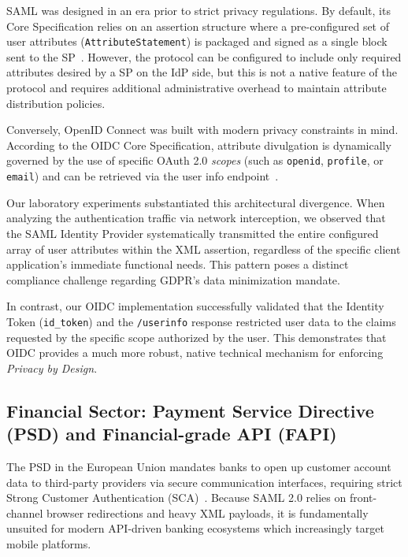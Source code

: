 \documentclass[../memoire.tex]{subfiles}
\begin{document}
SAML was designed in an era prior to strict privacy regulations. By default, its Core Specification relies on an assertion structure where a pre-configured set of user attributes (\texttt{AttributeStatement}) is packaged and signed as a single block sent to the SP~\cite{oasissaml}. However, the protocol can be configured to include only required attributes desired by a SP on the IdP side, but this is not a native feature of the protocol and requires additional administrative overhead to maintain attribute distribution policies.

Conversely, OpenID Connect was built with modern privacy constraints in mind. According to the OIDC Core Specification, attribute divulgation is dynamically governed by the use of specific OAuth 2.0 \textit{scopes} (such as \texttt{openid}, \texttt{profile}, or \texttt{email}) and can be retrieved via the user info endpoint~\cite{oidc_core}.

Our laboratory experiments substantiated this architectural divergence. When analyzing the authentication traffic via network interception, we observed that the SAML Identity Provider systematically transmitted the entire configured array of user attributes within the XML assertion, regardless of the specific client application's immediate functional needs. This pattern poses a distinct compliance challenge regarding GDPR's data minimization mandate. 

In contrast, our OIDC implementation successfully validated that the Identity Token (\texttt{id\_token}) and the \texttt{/userinfo} response restricted user data to the claims requested by the specific scope authorized by the user. This demonstrates that OIDC provides a much more robust, native technical mechanism for enforcing \textit{Privacy by Design}.



\subsection{Financial Sector: Payment Service Directive (PSD) and Financial-grade API (FAPI)}
The PSD in the European Union mandates banks to open up customer account data to third-party providers via secure communication interfaces, requiring strict Strong Customer Authentication (SCA)~\cite[30, article 97]{psd2_2015}. Because SAML 2.0 relies on front-channel browser redirections and heavy XML payloads, it is fundamentally unsuited for modern API-driven banking ecosystems which increasingly target mobile platforms.
\end{document}
